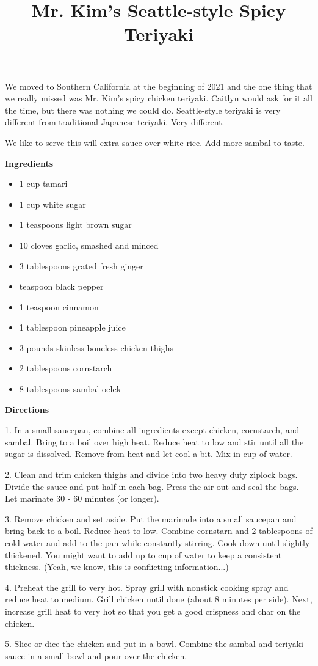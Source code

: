 \documentclass{article}
\title{Mr. Kim's Seattle-style Spicy Teriyaki}
\begin{document}
We moved to Southern California at the beginning of 2021 and the one thing
that we really missed was Mr. Kim's spicy chicken teriyaki. Caitlyn would
ask for it all the time, but there was nothing we could do. Seattle-style
teriyaki is very different from traditional Japanese teriyaki. Very different.

We like to serve this will extra sauce over white rice. Add more sambal to taste.

\bigskip

\bigskip

\textbf{Ingredients}

\begin{itemize}
      \item 1 cup tamari
      \item 1 cup white sugar
      \item 1 teaspoons light brown sugar
      \item 10 cloves garlic, smashed and minced
      \item 3 tablespoons grated fresh ginger
      \item {} teaspoon black pepper
      \item 1 teaspoon cinnamon
      \item 1 tablespoon pineapple juice
      \item 3 pounds skinless boneless chicken thighs
      \item 2 tablespoons cornstarch
      \item 8 tablespoons sambal oelek
\end{itemize}

\bigskip

\textbf{Directions}

1. In a small saucepan, combine all ingredients except chicken, cornstarch, and sambal.
Bring to a boil over high heat. Reduce heat to low and stir until all the sugar is
dissolved. Remove from heat and let cool a bit. Mix in  cup of water.

2. Clean and trim chicken thighs and divide into two heavy duty ziplock bags. Divide the
sauce and put half in each bag. Press the air out and seal the bags. Let marinate 30 - 60
minutes (or longer).

3. Remove chicken and set aside. Put the marinade into a small saucepan and bring back
to a boil. Reduce heat to low. Combine cornstarn and 2 tablespoons of cold water and
add to the pan while constantly stirring. Cook down until slightly thickened. You might
want to add up to  cup of water to keep a consistent thickness. (Yeah, we know, this
is conflicting information...)

4. Preheat the grill to very hot. Spray grill with nonstick cooking spray and reduce
heat to medium. Grill chicken until done (about 8 minutes per side). Next, increase grill
heat to very hot so that you get a good crispness and char on the chicken.

5. Slice or dice the chicken and put in a bowl. Combine the sambal and teriyaki sauce in
a small bowl and pour over the chicken.

\end{document}

